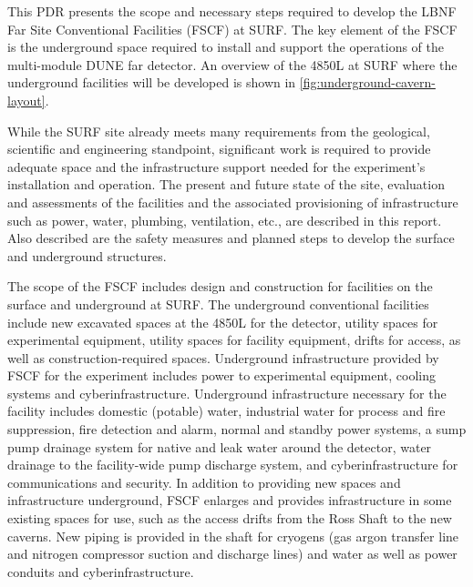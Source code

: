 This PDR presents the scope and necessary steps required to develop the LBNF Far Site Conventional Facilities (FSCF) at SURF. The key element of the FSCF is the underground space required to install and support the operations of the multi-module DUNE far detector. An overview of the 4850L at SURF where the underground facilities will be developed is shown in \ref{fig:underground-cavern-layout}.


While the SURF site already meets many requirements from the geological, scientific and engineering standpoint, significant work is required to provide adequate space and the infrastructure support needed for the experiment's installation and operation. The present and future state of the site, evaluation and assessments of the facilities and the associated provisioning of infrastructure such as power, water, plumbing, ventilation, etc., are described in this report. Also described are the safety measures and planned steps to develop the surface and underground structures. 

The scope of the FSCF includes design and construction for facilities on the surface and underground at SURF. The underground conventional facilities include new excavated spaces at the 4850L for the detector, utility spaces for experimental equipment, utility spaces for facility equipment, drifts for access, as well as construction-required spaces. Underground infrastructure provided by FSCF for the experiment includes power to experimental equipment, cooling systems and cyberinfrastructure. Underground infrastructure necessary for the facility includes domestic (potable) water, industrial water for process and fire suppression, fire detection and alarm, normal and standby power systems, a sump pump drainage system for native and leak water around the detector, water drainage to the facility-wide pump discharge system, and cyberinfrastructure for communications and security. In addition to providing new spaces and infrastructure underground, FSCF enlarges and provides infrastructure in some existing spaces for use, such as the access drifts from the Ross Shaft to the new caverns. New piping is provided in the shaft for cryogens (gas argon transfer line and nitrogen compressor suction and discharge lines) and water as well as power conduits and cyberinfrastructure.

